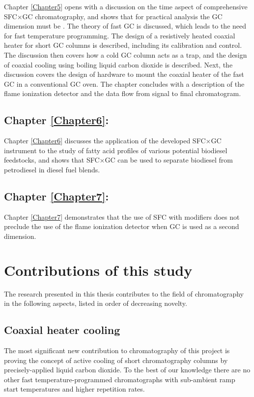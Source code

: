 Chapter \ref{Chapter5} opens with a discussion on the time aspect of
comprehensive SFC×GC chromatography, and shows that for practical analysis the
GC dimension must be . The theory of fast GC is discussed, which
leads to the need for fast temperature programming. The design of a resistively
heated coaxial heater for short GC columns is described, including its
calibration and control. The discussion then covers how a cold GC column acts as
a trap, and the design of coaxial cooling using boiling liquid carbon dioxide is
described. Next, the discussion covers the design of hardware to mount the
coaxial heater of the fast GC in a conventional GC oven. The chapter concludes
with a description of the flame ionization detector and the data flow from
signal to final chromatogram.

\subsection{Chapter \ref{Chapter6}:  }

Chapter \ref{Chapter6} discusses the application of the developed SFC×GC
instrument to the study of fatty acid profiles of various potential biodiesel
feedstocks, and shows that SFC×GC can be used to separate biodiesel from
petrodiesel in diesel fuel blends.

\subsection{Chapter \ref{Chapter7}:  }

Chapter \ref{Chapter7} demonstrates that the use of SFC with modifiers does not
preclude the use of the flame ionization detector when GC is used as a second
dimension.

\section{Contributions of this study}

The research presented in this thesis contributes to the field of chromatography
in the following aspects, listed in order of decreasing novelty.

\subsection{Coaxial heater cooling}

The most significant new contribution to chromatography of this project is
proving the concept of active cooling of short chromatography columns by
precisely-applied liquid carbon dioxide. To the best of our knowledge there are
no other fast temperature-programmed chromatographs with sub-ambient ramp start
temperatures and higher repetition rates.

